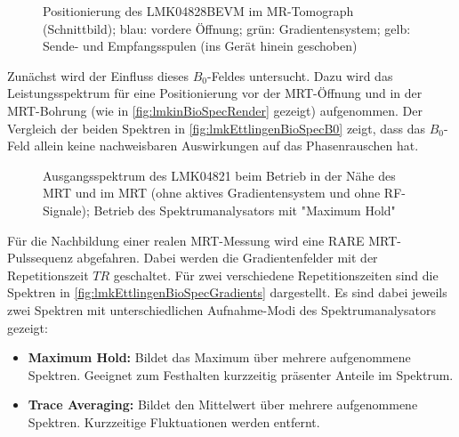 \begin{figure}[H]
	\centering
	\caption[LMK04821 Position in Tomograph]{Positionierung des LMK04828BEVM im MR-Tomograph (Schnittbild); blau: vordere Öffnung; grün: Gradientensystem; gelb: Sende- und Empfangsspulen (ins Gerät hinein geschoben)}
	\label{fig:lmkinBioSpecRender}
\end{figure}

Zunächst wird der Einfluss dieses $B_0$-Feldes untersucht. Dazu wird das Leistungsspektrum für eine Positionierung vor der MRT-Öffnung und in der MRT-Bohrung (wie in \autoref{fig:lmkinBioSpecRender} gezeigt) aufgenommen. Der Vergleich der beiden Spektren in \autoref{fig:lmkEttlingenBioSpecB0} zeigt, dass das $B_0$-Feld allein keine nachweisbaren Auswirkungen auf das Phasenrauschen hat.

\begin{figure}[H]
	\centering
	\caption[]{Ausgangsspektrum des LMK04821 beim Betrieb in der Nähe des MRT und im MRT (ohne aktives Gradientensystem und ohne RF-Signale); Betrieb des Spektrumanalysators mit "Maximum Hold"}
	\label{fig:lmkEttlingenBioSpecB0}
\end{figure}

Für die Nachbildung einer realen MRT-Messung wird eine RARE MRT-Pulssequenz abgefahren. Dabei werden die Gradientenfelder mit der Repetitionszeit $TR$ geschaltet. Für zwei verschiedene Repetitionszeiten sind die Spektren in \autoref{fig:lmkEttlingenBioSpecGradients} dargestellt. Es sind dabei jeweils zwei Spektren mit unterschiedlichen Aufnahme-Modi des Spektrumanalysators gezeigt:
\begin{itemize}
	\item \textbf{Maximum Hold:} Bildet das Maximum über mehrere aufgenommene Spektren. Geeignet zum Festhalten kurzzeitig präsenter Anteile im Spektrum.
	\item \textbf{Trace Averaging:} Bildet den Mittelwert über mehrere aufgenommene Spektren. Kurzzeitige Fluktuationen werden entfernt.
\end{itemize}

